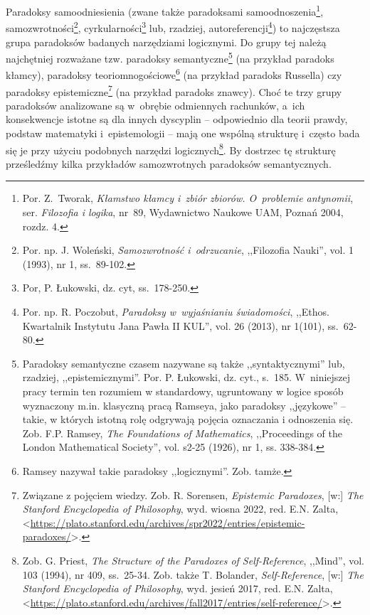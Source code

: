 Paradoksy samoodniesienia (zwane także paradoksami samoodnoszenia\footnote{Por. Z.~Tworak, \textit{Kłamstwo kłamcy i~zbiór zbiorów. O~problemie antynomii}, ser. \textit{Filozofia i logika}, nr~89, Wydawnictwo Naukowe UAM, Poznań 2004, rozdz. 4.}, samozwrotności\footnote{Por. np. J. Woleński, \textit{Samozwrotność i~odrzucanie}, ,,Filozofia Nauki'', vol. 1 (1993), nr 1, ss.~89-102.}, cyrkularności\footnote{Por, P. Łukowski, dz. cyt, ss.~178-250.} lub, rzadziej, autoreferencji\footnote{Por. np. R. Poczobut, \textit{Paradoksy w~wyjaśnianiu świadomości}, ,,Ethos. Kwartalnik Instytutu Jana Pawła II KUL'', vol. 26 (2013), nr 1(101), ss.~62-80.}) to najczęstsza grupa paradoksów badanych narzędziami logicznymi. Do grupy tej należą najchętniej rozważane tzw. paradoksy semantyczne\footnote{Paradoksy semantyczne czasem nazywane są także ,,syntaktycznymi'' lub, rzadziej, ,,epistemicznymi''. Por. P. Łukowski, dz. cyt., s.~185. W~niniejszej pracy termin ten rozumiem w standardowy, ugruntowany w logice sposób wyznaczony m.in. klasyczną pracą Ramseya, jako paradoksy ,,językowe'' -- takie, w których istotną rolę odgrywają pojęcia oznaczania i odnoszenia się. Zob. F.P. Ramsey, \textit{The Foundations of Mathematics}, ,,Proceedings of the London Mathematical Society'', vol. s2-25 (1926), nr 1, ss. 338-384.} (na przykład paradoks kłamcy), paradoksy teoriomnogościowe\footnote{Ramsey nazywał takie paradoksy ,,logicznymi''. Zob. tamże.} (na przykład paradoks Russella) czy paradoksy epistemiczne\footnote{Związane z pojęciem wiedzy. Zob. R. Sorensen, \textit{Epistemic Paradoxes}, [w:] \textit{The Stanford Encyclopedia of Philosophy}, wyd. wiosna 2022, red. E.N. Zalta, <\url{https://plato.stanford.edu/archives/spr2022/entries/epistemic-paradoxes/}>.} (na przykład paradoks znawcy). Choć te trzy grupy paradoksów analizowane są w~obrębie odmiennych rachunków, a~ich konsekwencje istotne są dla innych dyscyplin -- odpowiednio dla teorii prawdy, podstaw matematyki i~epistemologii -- mają one wspólną strukturę i~często bada się je przy użyciu podobnych narzędzi logicznych\footnote{Zob. G. Priest, \textit{The Structure of the Paradoxes of Self-Reference}, ,,Mind'', vol. 103 (1994), nr 409, ss.~25-34. Zob. także T. Bolander, \textit{Self-Reference}, [w:] \textit{The Stanford Encyclopedia of Philosophy}, wyd. jesień 2017, red. E.N. Zalta, {\textless}\url{https://plato.stanford.edu/archives/fall2017/entries/self-reference/}{\textgreater}.}. By dostrzec tę strukturę prześledźmy kilka przykładów samozwrotnych paradoksów semantycznych.

